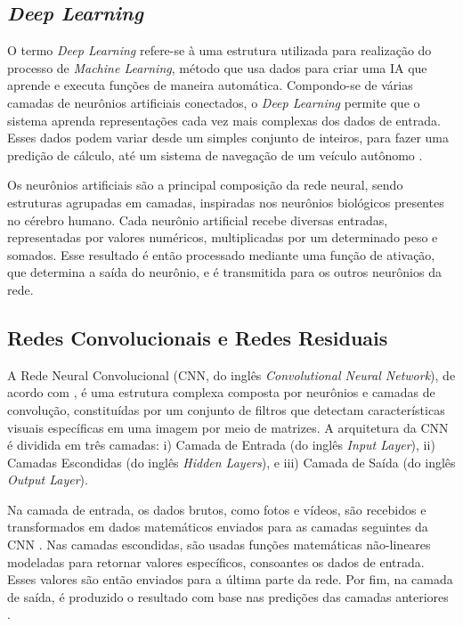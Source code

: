 
\subsection{\esp \textit{Deep Learning}} \label{deeplearning}


O termo \textit{Deep Learning} refere-se à uma estrutura utilizada para realização do processo de \textit{Machine Learning}, método que usa dados para criar uma IA que aprende e executa funções de maneira automática. Compondo-se de várias camadas de neurônios artificiais conectados, o \textit{Deep Learning} permite que o sistema aprenda representações cada vez mais complexas dos dados de entrada. Esses dados podem variar desde um simples conjunto de inteiros, para fazer uma predição de cálculo, até um sistema de navegação de um veículo autônomo \cite{deeplearning}.

Os neurônios artificiais são a principal composição da rede neural, sendo estruturas agrupadas em camadas, inspiradas nos neurônios biológicos presentes no cérebro humano. Cada neurônio artificial recebe diversas entradas, representadas por valores numéricos, multiplicadas por um determinado peso e somados. Esse resultado é então processado mediante uma função de ativação, que determina a saída do neurônio, e é transmitida para os outros neurônios da rede.





\subsection{\esp Redes Convolucionais e Redes Residuais} \label{redesconvoleredesresidual}

A Rede Neural Convolucional (CNN, do inglês \textit{Convolutional Neural Network}), de acordo com , é uma estrutura complexa composta por neurônios e camadas de convolução, constituídas por um conjunto de filtros que detectam características visuais específicas em uma imagem por meio de matrizes. A arquitetura da CNN é dividida em três camadas: i) Camada de Entrada (do inglês \textit{Input Layer}), ii) Camadas Escondidas (do inglês \textit{Hidden Layers}), e iii) Camada de Saída (do inglês \textit{Output Layer}).

Na camada de entrada, os dados brutos, como fotos e vídeos, são recebidos e transformados em dados matemáticos enviados para as camadas seguintes da CNN \cite{cnn}. Nas camadas escondidas, são usadas funções matemáticas não-lineares modeladas para retornar valores específicos, consoantes os dados de entrada. Esses valores são então enviados para a última parte da rede. Por fim, na camada de saída, é produzido o resultado com base nas predições das camadas anteriores \cite{medical}.

